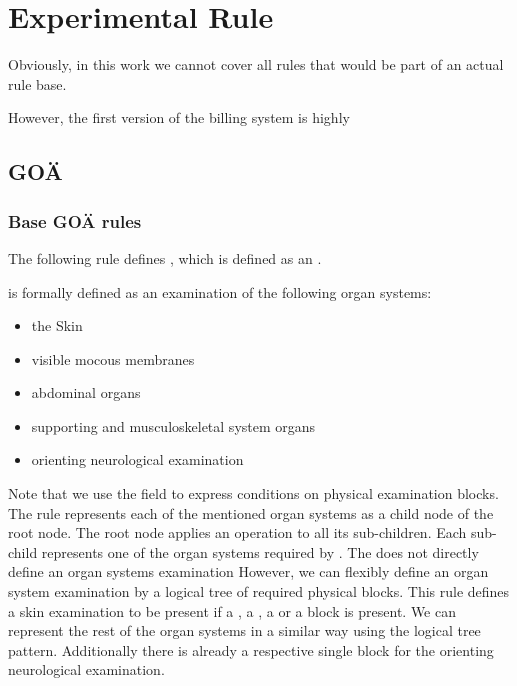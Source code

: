 \section{Experimental Rule}\label{sec:experimental-rule-base}

Obviously, in this work we cannot cover all rules that would be part of an actual rule base.

However, the first version of the billing system is highly

\subsection{GOÄ}
\subsubsection{Base GOÄ rules}

The following rule defines , which is defined as an .




 is formally defined as an examination of the following organ systems:
\begin{itemize}
    \item the Skin
    \item visible mocous membranes
    \item abdominal organs
    \item supporting and musculoskeletal system organs
    \item orienting neurological examination
\end{itemize}

Note that we use the  field to express conditions on physical examination blocks.
The rule represents each of the mentioned organ systems as a child node of the root node.
The root node applies an  operation to all its sub-children.
Each sub-child represents one of the organ systems required by .
The \AVS does not directly define an organ systems examination
However, we can flexibly define an organ system examination by a logical tree of required physical blocks.
This rule defines a skin examination to be present if a , a , a  or a  block is present.
We can represent the rest of the organ systems in a similar way using the logical tree pattern.
Additionally there is already a respective single block for the orienting neurological examination.

